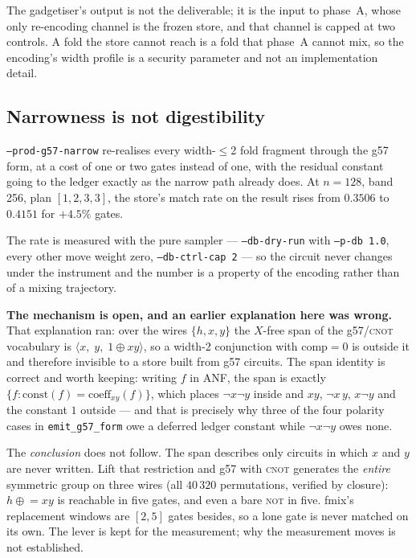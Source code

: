 \documentclass[11pt]{article}
\newcommand{\code}[1]{\texttt{#1}}
\begin{document}
The gadgetiser's output is not the deliverable; it is the input to phase~A,
whose only re-encoding channel is the frozen store, and that channel is capped
at two controls. A fold the store cannot reach is a fold that phase~A cannot
mix, so the encoding's width profile is a security parameter and not an
implementation detail.

\subsection{Narrowness is not digestibility}

\code{--prod-g57-narrow} re-realises every width-$\leq$2 fold fragment through
the g57 form, at a cost of one or two gates instead of one, with the residual
constant going to the ledger exactly as the narrow path already does. At
$n{=}128$, band 256, plan $[1,2,3,3]$, the store's match rate on the result
rises from $0.3506$ to $0.4151$ for $+4.5\%$ gates.

The rate is measured with the pure sampler --- \code{--db-dry-run} with
\code{--p-db 1.0}, every other move weight zero, \code{--db-ctrl-cap 2} --- so
the circuit never changes under the instrument and the number is a property of
the encoding rather than of a mixing trajectory.

\textbf{The mechanism is open, and an earlier explanation here was wrong.}
That explanation ran: over the wires $\{h,x,y\}$ the $X$-free span of the
g57/\textsc{cnot} vocabulary is $\langle x,\; y,\; 1 \oplus xy \rangle$, so a
width-2 conjunction with $\text{comp}=0$ is outside it and therefore invisible
to a store built from g57 circuits. The span identity is correct and worth
keeping: writing $f$ in ANF, the span is exactly
$\{f : \text{const}(f) = \text{coeff}_{xy}(f)\}$, which places $\lnot x \lnot y$
inside and $xy$, $\lnot x\, y$, $x \lnot y$ and the constant $1$ outside --- and
that is precisely why three of the four polarity cases in \code{emit\_g57\_form}
owe a deferred ledger constant while $\lnot x \lnot y$ owes none.

The \emph{conclusion} does not follow. The span describes only circuits in
which $x$ and $y$ are never written. Lift that restriction and g57 with
\textsc{cnot} generates the \emph{entire} symmetric group on three wires (all
$40\,320$ permutations, verified by closure): $h \mathrel{\oplus}= xy$ is
reachable in five gates, and even a bare \textsc{not} in five. fmix's
replacement windows are $[2,5]$ gates besides, so a lone gate is never matched
on its own. The lever is kept for the measurement; why the measurement moves is
not established.
\end{document}
